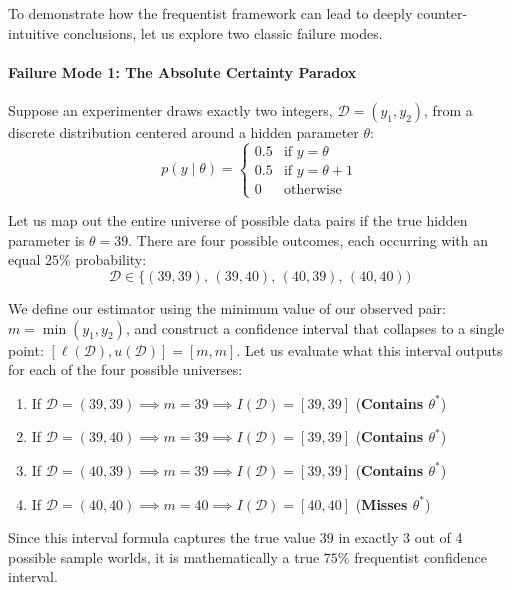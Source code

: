 \documentclass{article}
\begin{document}
To demonstrate how the frequentist framework can lead to deeply counter-intuitive conclusions, let us explore two classic failure modes.

\paragraph{Failure Mode 1: The Absolute Certainty Paradox}
Suppose an experimenter draws exactly two integers, $\mathcal{D} = (y_1, y_2)$, from a discrete distribution centered around a hidden parameter $\theta$:
\begin{equation}
p(y \mid \theta) = 
\begin{cases} 
0.5 & \text{if } y = \theta \\ 
0.5 & \text{if } y = \theta + 1 \\ 
0 & \text{otherwise} 
\end{cases}
\end{equation}

Let us map out the entire universe of possible data pairs if the true hidden parameter is $\theta = 39$. There are four possible outcomes, each occurring with an equal $25\%$ probability:
\begin{equation}
\mathcal{D} \in \big\{(39, 39), \, (39, 40), \, (40, 39), \, (40, 40)\big)
\end{equation}

We define our estimator using the minimum value of our observed pair: $m = \min(y_1, y_2)$, and construct a confidence interval that collapses to a single point: $[\ell(\mathcal{D}), u(\mathcal{D})] = [m, m]$. Let us evaluate what this interval outputs for each of the four possible universes:
\begin{enumerate}
    \item If $\mathcal{D} = (39, 39) \implies m = 39 \implies I(\mathcal{D}) = [39, 39]$ \hfill (\textbf{Contains $\theta^*$})
    \item If $\mathcal{D} = (39, 40) \implies m = 39 \implies I(\mathcal{D}) = [39, 39]$ \hfill (\textbf{Contains $\theta^*$})
    \item If $\mathcal{D} = (40, 39) \implies m = 39 \implies I(\mathcal{D}) = [39, 39]$ \hfill (\textbf{Contains $\theta^*$})
    \item If $\mathcal{D} = (40, 40) \implies m = 40 \implies I(\mathcal{D}) = [40, 40]$ \hfill (\textbf{Misses $\theta^*$})
\end{enumerate}

Since this interval formula captures the true value $39$ in exactly 3 out of 4 possible sample worlds, it is mathematically a true $75\%$ frequentist confidence interval.
\end{document}
